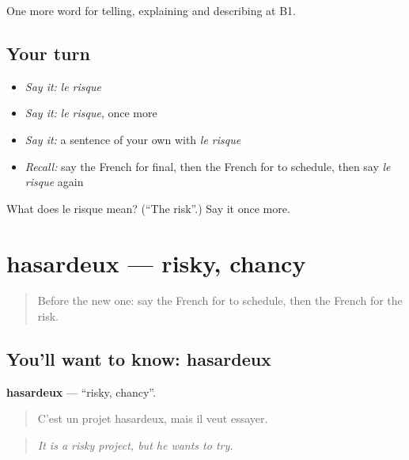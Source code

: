 \begin{grammarlens}[title={What you've built}]
One more word for telling, explaining and describing at B1.
\end{grammarlens}

\subsection*{Your turn}
\begin{itemize}
\raggedright
  \item \emph{Say it:} \emph{le risque}
  \item \emph{Say it:} \emph{le risque}, once more
  \item \emph{Say it:} a sentence of your own with \emph{le risque}
  \item \emph{Recall:} say the French for final, then the French for to schedule, then say \emph{le risque} again
\end{itemize}

\begin{tcolorbox}[breakable,colback=teal!4,colframe=teal!35!black,title={Before you move on}]
What does le risque mean? (\textquotedblleft{}The risk\textquotedblright{}.) Say it once more.
\end{tcolorbox}
\section[hasardeux]{hasardeux — risky, chancy}

\label{lesson:FR-C372-hasardeux}



\begin{quote}
Before the new one: say the French for to schedule, then the French for the risk.
\end{quote}

\subsection*{You'll want to know: hasardeux}
\textbf{hasardeux} — \textquotedblleft{}risky, chancy\textquotedblright{}.

\begin{quote}
C'est un projet hasardeux, mais il veut essayer.
\end{quote}

\begin{quote}
\emph{It is a risky project, but he wants to try.}
\end{quote}

